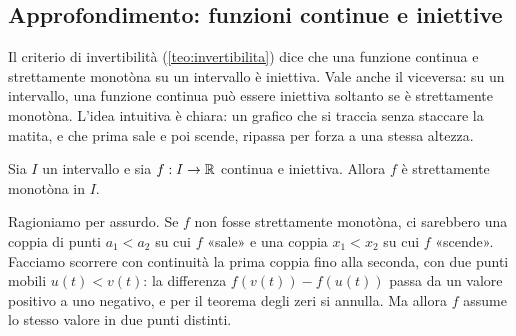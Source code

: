 \subsection{Approfondimento: funzioni continue e iniettive}
\label{subsec:continue-iniettive}

Il criterio di invertibilità (\cref{teo:invertibilita}) dice che una funzione continua e
strettamente monotòna su un intervallo è iniettiva. Vale anche il viceversa: su un
intervallo, una funzione continua può essere iniettiva soltanto se è strettamente
monotòna. L'idea intuitiva è chiara: un grafico che si traccia senza staccare la matita,
e che prima sale e poi scende, ripassa per forza a una stessa altezza.

\begin{proposizione}\label{prop:continua-iniettiva-monotona}
Sia $I$ un intervallo e sia $f:I\to\mathbb{R}$ continua e iniettiva. Allora $f$ è strettamente
monotòna in $I$.
\end{proposizione}

\begin{schema}
\end{schema}

\begin{strategia}
Ragioniamo per assurdo. Se $f$ non fosse strettamente monotòna, ci sarebbero una coppia
di punti $a_{1}<a_{2}$ su cui $f$ «sale» e una coppia $x_{1}<x_{2}$ su cui $f$
«scende». Facciamo scorrere con continuità la prima coppia fino alla seconda, con due
punti mobili $u(t)<v(t)$: la differenza $f(v(t))-f(u(t))$ passa da un valore positivo a
uno negativo, e per il teorema degli zeri si annulla. Ma allora $f$ assume lo stesso
valore in due punti distinti.
\end{strategia}

